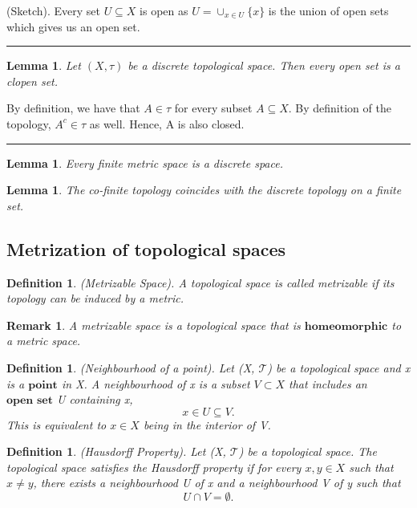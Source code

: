 \documentclass[twoside]{article}
\newtheorem{lemma}[theorem]{Lemma}
\newtheorem{definition}[theorem]{Definition}
\newtheorem{remark}[theorem]{Remark}
\newenvironment{proof}{{\bf Proof:}}{\hfill\rule{2mm}{2mm}}
\begin{document}
\begin{proof}(Sketch). Every set $U \subseteq X$ is open as $U = \cup_{x \in U}\{x\}$ is the union of open sets which gives us an open set.
\end{proof}

\begin{lemma} Let $(X, \tau)$ be a discrete topological space. Then every open set is a clopen set.
\end{lemma}
\begin{proof} By definition, we have that $A \in \tau$ for every subset $A \subseteq X$. By definition of the topology, $A^c \in \tau$ as well. Hence, A is also closed.
\end{proof}

\begin{lemma} Every finite metric space is a discrete space.
\end{lemma}

\begin{lemma}The co-finite topology coincides with the discrete topology on a finite set.
\end{lemma}

\subsection{Metrization of topological spaces}

\begin{definition}(Metrizable Space). A topological space is called metrizable if its topology can be induced by a metric.
\end{definition}

\begin{remark} A metrizable space is a topological space that is $\textbf{homeomorphic}$ to a metric space. 
\end{remark}

\begin{definition}(Neighbourhood of a point). Let (X, $\mathcal{T}$) be a topological space and x is a $\textbf{point}$ in X. A neighbourhood of x is a subset $V \subset X$ that includes an $\textbf{open set}$ U containing x,
$$
x \in U \subseteq V.
$$
This is equivalent to $x \in X$ being in the interior of V.
\end{definition}

\begin{definition}(Hausdorff Property). Let (X, $\mathcal{T}$) be a topological space. The topological space satisfies the Hausdorff property if for every $x, y \in X$ such that $x \neq y$, there exists a neighbourhood U of x and a neighbourhood V of y such that
$$
U \cap V = \emptyset.
$$
\end{definition}
\end{document}
